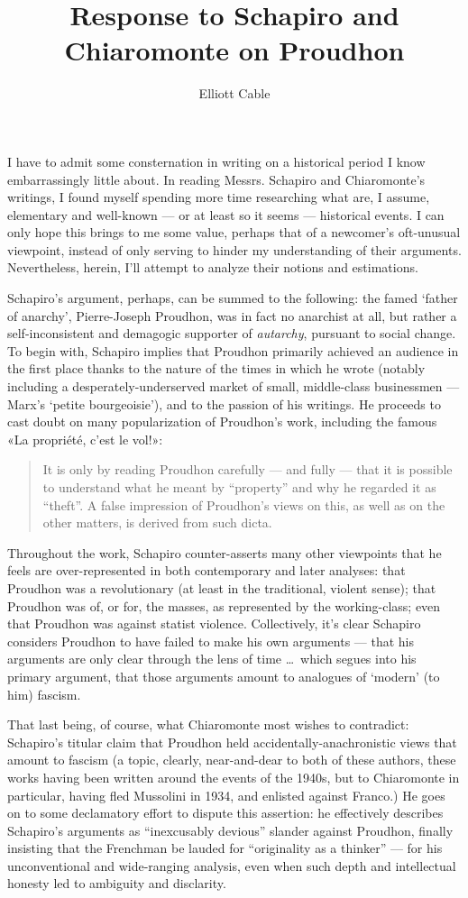 \documentclass[man]{apa}
\title{Response to Schapiro and Chiaromonte on Proudhon}
\author{Elliott Cable}
\affiliation{Department of Computer Science}
\begin{document}
\EnableQuotes
\maketitle
I have to admit some consternation in writing on a historical period I know embarrassingly little about. In reading Messrs. Schapiro and Chiaromonte's writings, I found myself spending more time researching what are, I assume, elementary and well-known — or at least so it seems — historical events. I can only hope this brings to me some value, perhaps that of a newcomer's oft-unusual viewpoint, instead of only serving to hinder my understanding of their arguments. Nevertheless, herein, I'll attempt to analyze their notions and estimations.

Schapiro's argument, perhaps, can be summed to the following: the famed ‘father of anarchy’, Pierre-Joseph Proudhon, was in fact no anarchist at all, but rather a self-inconsistent and demagogic supporter of \emph{autarchy}, pursuant to social change. To begin with, Schapiro implies that Proudhon primarily achieved an audience in the first place thanks to the nature of the times in which he wrote (notably including a desperately-underserved market of small, middle-class businessmen — Marx's ‘petite bourgeoisie’), and to the passion of his writings. He proceeds to cast doubt on many popularization of Proudhon's work, including the famous «La propriété, c'est le vol!»: \blockquote{It is only by reading Proudhon carefully — and fully — that it is possible to understand what he meant by “property” and why he regarded it as “theft”. A false impression of Proudhon's views on this, as well as on the other matters, is derived from such dicta.}

Throughout the work, Schapiro counter-asserts many other viewpoints that he feels are over-represented in both contemporary and later analyses: that Proudhon was a revolutionary (at least in the traditional, violent sense); that Proudhon was of, or for, the masses, as represented by the working-class; even that Proudhon was against statist violence. Collectively, it's clear Schapiro considers Proudhon to have failed to make his own arguments — that his arguments are only clear through the lens of time \ldots\ which segues into his primary argument, that those arguments amount to analogues of ‘modern’ (to him) fascism.

That last being, of course, what Chiaromonte most wishes to contradict: Schapiro's titular claim that Proudhon held accidentally-anachronistic views that amount to fascism (a topic, clearly, near-and-dear to both of these authors, these works having been written around the events of the 1940s, but to Chiaromonte in particular, having fled Mussolini in 1934, and enlisted against Franco.) He goes on to some declamatory effort to dispute this assertion: he effectively describes Schapiro's arguments as “inexcusably devious” slander against Proudhon, finally insisting that the Frenchman be lauded for “originality as a thinker” — for his unconventional and wide-ranging analysis, even when such depth and intellectual honesty led to ambiguity and disclarity.
\end{document}
